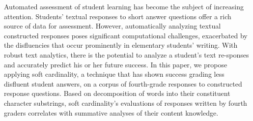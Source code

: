 Automated assessment of student learning has become the subject of increasing attention. Students' textual responses to short answer questions offer a rich source of data for assessment. However, automatically analyzing textual constructed responses poses significant computational challenges, exacerbated by the disfluencies that occur prominently in elementary students' writing. With robust text analytics, there is the potential to analyze a student's text re-sponses and accurately predict his or her future success.  In this paper, we propose applying soft cardinality, a technique that has shown success grading less disfluent student answers, on a corpus of fourth-grade responses to constructed response questions. Based on decomposition of words into their constituent character substrings, soft cardinality's evaluations of responses written by fourth graders correlates with summative analyses of their content knowledge.
